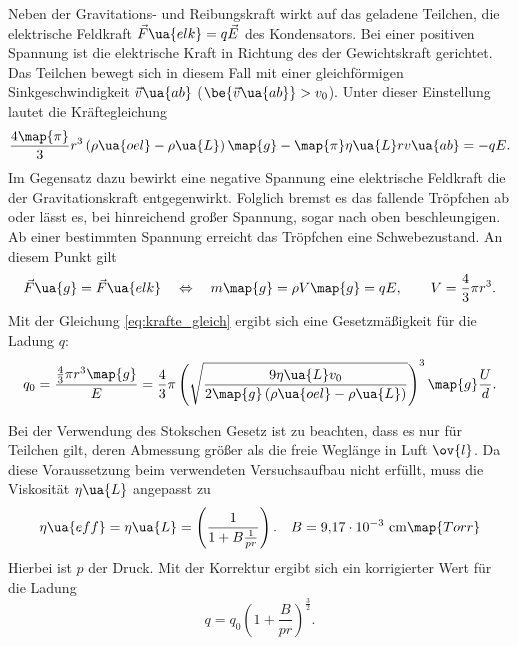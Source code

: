 Neben der Gravitations- und Reibungskraft wirkt auf das geladene Teilchen,
die elektrische Feldkraft $\vec{F}\ua{elk}=q\vec{E}$ des Kondensators.
Bei einer positiven Spannung ist die elektrische Kraft in Richtung des der Gewichtskraft gerichtet.
Das Teilchen bewegt sich in diesem Fall mit einer gleichförmigen Sinkgeschwindigkeit $\vec{v}\ua{ab}$ ($\be{\vec{v}\ua{ab}}>v_0$).
Unter dieser Einstellung lautet die Kräftegleichung
\begin{equation}
  \label{eq:kraefte_eins}
    \frac{4\map{\pi}}{3}r^3\left(\rho\ua{oel}-\rho\ua{L}\right)\map{g}-\map{\pi}\eta\ua{L}r v\ua{ab}=-qE.
\end{equation}
Im Gegensatz dazu bewirkt eine negative Spannung eine elektrische Feldkraft die der Gravitationskraft
entgegenwirkt. Folglich bremst es das fallende Tröpfchen ab oder
lässt es, bei hinreichend großer Spannung, sogar nach oben beschleungigen.
Ab einer bestimmten Spannung erreicht das Tröpfchen eine Schwebezustand. An diesem
Punkt gilt
\begin{equation}
  \label{eq:krafte_gleich}
  \vec{F}\ua{g}=\vec{F}\ua{elk} \quad \Leftrightarrow \quad m\map{g}=\rho V\map{g}=qE, \qquad V=\frac{4}{3}\pi r^3.
\end{equation}
Mit der Gleichung \eqref{eq:krafte_gleich} ergibt sich eine Gesetzmäßigkeit für die Ladung $q$:
\begin{equation}
  \label{eq:q}
  q_0=\frac{\frac{4}{3}\pi r^3 \map{g}}{E} =\frac{4}{3} \pi \left( \sqrt{\frac{9\eta\ua{L}v_0}{2\map{g}\left(\rho\ua{oel}-\rho\ua{L}\right)}}\right)^3 \map{g} \frac{U}{d}.
\end{equation}


Bei der Verwendung des Stokschen Gesetz ist zu beachten, dass es nur für Teilchen gilt,
deren Abmessung größer als die freie Weglänge in Luft $\ov{l}$.
Da diese Voraussetzung beim verwendeten Versuchsaufbau nicht erfüllt, muss die Viskosität $\eta\ua{L}$
angepasst zu
\begin{equation*}
  \eta\ua{eff}=\eta\ua{L}=\left(\frac{1}{1+B\frac{1}{pr}}\right). \quad B=\SI{9.17e-3}\,\si{\centi\meter}\map{Torr}
\end{equation*}
Hierbei ist $p$ der Druck. Mit der Korrektur ergibt sich ein korrigierter Wert für die Ladung
\begin{equation}
  \label{eq:q_korri}
  q=q_0\left(1+\frac{B}{pr}\right)^{\frac{3}{2}}.
\end{equation}
